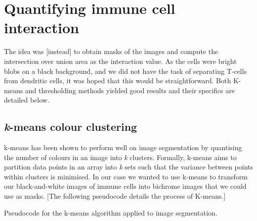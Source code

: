 \section{Quantifying immune cell interaction}


The idea was [instead] to obtain masks of the images and compute the intersection over union area as the interaction value. As the cells were bright blobs on a black background, and we did not have the task of separating T-cells from dendritic cells, it was hoped that this would be straightforward. Both K-means and thresholding methods yielded good results and their specifics are detailed below.

\subsection{\textit{k}-means colour clustering}

k-means has been shown to perform well on image segmentation by quantising the number of colours in an image into \textit{k} clusters. Formally, k-means aims to partition data points in an array into \textit{k} sets such that the variance between points within clusters is minimised. In our case we wanted to use k-means to transform our black-and-white images of immune cells into bichrome images that we could use as masks. [The following pseudocode details the process of K-means.]

\begin{algorithm}
    \DontPrintSemicolon

\caption{Pseudocode for the k-means algorithm applied to image segmentation.}
\label{alg:kmeans}
\end{algorithm}

